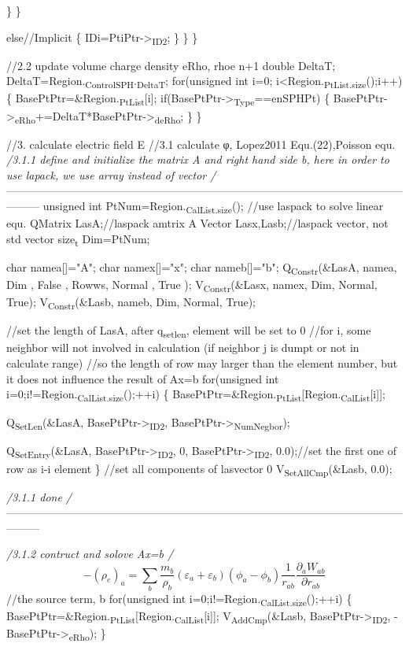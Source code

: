 \documentclass[presentation]{beamer}
\begin{document}
    \}
\}

      else//Implicit
        \{
          IDi=PtiPtr->\textsubscript{ID2};
        \}
    \}
\}

//2.2 update volume charge density eRho, rhoe n+1
double DeltaT;
DeltaT=Region.\textsubscript{ControlSPH}.\textsubscript{DeltaT};
for(unsigned int i=0; i<Region.\textsubscript{PtList.size}();i++)
  \{
    BasePtPtr=\&Region.\textsubscript{PtList}[i];
    if(BasePtPtr->\textsubscript{Type}==enSPHPt)
      \{
        BasePtPtr->\textsubscript{eRho}+=DeltaT*BasePtPtr->\textsubscript{deRho};
      \}
  \}

//3. calculate electric field E
//3.1 calculate φ, Lopez2011 Equ.(22),Poisson equ.
\emph{/3.1.1 define and initialize the matrix A and right hand side b, here in order to use lapack, we use array instead of vector
/}---------------------------------------------------------------------------------------------------------------------
unsigned int PtNum=Region.\textsubscript{CalList.size}();
//use laspack to solve linear equ.
QMatrix LasA;//laspack amtrix A
Vector Lasx,Lasb;//laspack vector, not std vector
size\textsubscript{t} Dim=PtNum;

char namea[]="A";
char namex[]="x";
char nameb[]="b";
Q\textsubscript{Constr}(\&LasA, namea, Dim , False , Rowws, Normal , True );
V\textsubscript{Constr}(\&Lasx, namex, Dim, Normal, True);
V\textsubscript{Constr}(\&Lasb, nameb, Dim, Normal, True);

//set the length of LasA, after q\textsubscript{setlen}, element will be set to 0
//for i, some neighbor will not involved in calculation (if neighbor j is dumpt or not in calculate range)
//so the length of row may larger than the element number, but it does not influence the result of Ax=b
for(unsigned int i=0;i!=Region.\textsubscript{CalList.size}();++i)
  \{
    BasePtPtr=\&Region.\textsubscript{PtList}[Region.\textsubscript{CalList}[i]];

Q\textsubscript{SetLen}(\&LasA, BasePtPtr->\textsubscript{ID2}, BasePtPtr->\textsubscript{NumNegbor});

    Q\textsubscript{SetEntry}(\&LasA, BasePtPtr->\textsubscript{ID2}, 0, BasePtPtr->\textsubscript{ID2}, 0.0);//set the first one of row as i-i element
  \}
//set all components of lasvector 0
V\textsubscript{SetAllCmp}(\&Lasb, 0.0);

\emph{/3.1.1 done
/}---------------------------------------------------------------------------------------------------------------------

\emph{/3.1.2 contruct and solove Ax=b
/}\[ - {\left( {{\rho _e}} \right)_a} = \sum\limits_b {\frac{{{m_b}}}{{{\rho _b}}}} ({\varepsilon _a} + {\varepsilon _b})({\phi _a} - {\phi _b})\frac{1}{{{r_{ab}}}}\frac{{{\partial _a}{W_{ab}}}}{{\partial {r_{ab}}}}\]
//the source term, b
for(unsigned int i=0;i!=Region.\textsubscript{CalList.size}();++i)
  \{
    BasePtPtr=\&Region.\textsubscript{PtList}[Region.\textsubscript{CalList}[i]];
    V\textsubscript{AddCmp}(\&Lasb, BasePtPtr->\textsubscript{ID2}, -BasePtPtr->\textsubscript{eRho});
  \}
\end{document}
